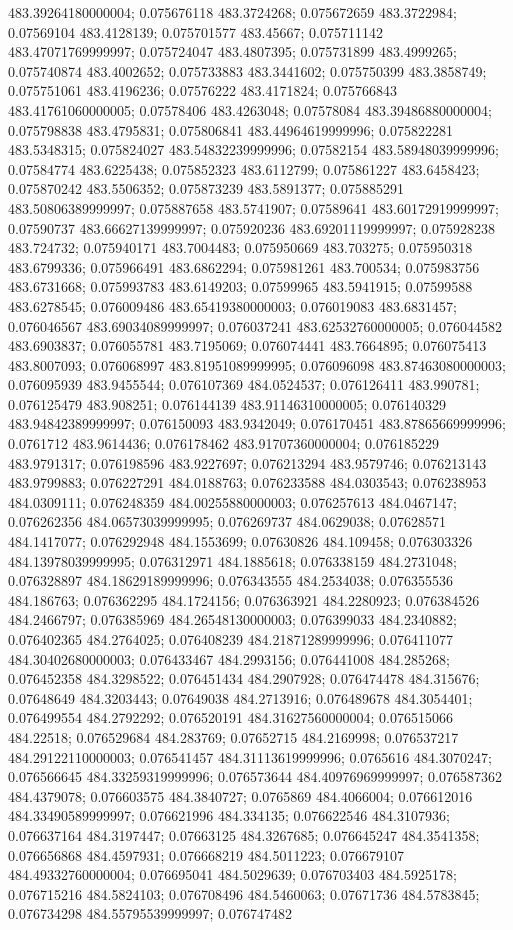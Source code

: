 483.39264180000004; 0.075676118 483.3724268; 0.075672659 483.3722984; 0.07569104 483.4128139; 0.075701577 483.45667; 0.075711142 483.47071769999997; 0.075724047 483.4807395; 0.075731899 483.4999265; 0.075740874 483.4002652; 0.075733883 483.3441602; 0.075750399 483.3858749; 0.075751061 483.4196236; 0.07576222 483.4171824; 0.075766843 483.41761060000005; 0.07578406 483.4263048; 0.07578084 483.39486880000004; 0.075798838 483.4795831; 0.075806841 483.44964619999996; 0.075822281 483.5348315; 0.075824027 483.54832239999996; 0.07582154 483.58948039999996; 0.07584774 483.6225438; 0.075852323 483.6112799; 0.075861227 483.6458423; 0.075870242 483.5506352; 0.075873239 483.5891377; 0.075885291 483.50806389999997; 0.075887658 483.5741907; 0.07589641 483.60172919999997; 0.07590737 483.66627139999997; 0.075920236 483.69201119999997; 0.075928238 483.724732; 0.075940171 483.7004483; 0.075950669 483.703275; 0.075950318 483.6799336; 0.075966491 483.6862294; 0.075981261 483.700534; 0.075983756 483.6731668; 0.075993783 483.6149203; 0.07599965 483.5941915; 0.07599588 483.6278545; 0.076009486 483.65419380000003; 0.076019083 483.6831457; 0.076046567 483.69034089999997; 0.076037241 483.62532760000005; 0.076044582 483.6903837; 0.076055781 483.7195069; 0.076074441 483.7664895; 0.076075413 483.8007093; 0.076068997 483.81951089999995; 0.076096098 483.87463080000003; 0.076095939 483.9455544; 0.076107369 484.0524537; 0.076126411 483.990781; 0.076125479 483.908251; 0.076144139 483.91146310000005; 0.076140329 483.94842389999997; 0.076150093 483.9342049; 0.076170451 483.87865669999996; 0.0761712 483.9614436; 0.076178462 483.91707360000004; 0.076185229 483.9791317; 0.076198596 483.9227697; 0.076213294 483.9579746; 0.076213143 483.9799883; 0.076227291 484.0188763; 0.076233588 484.0303543; 0.076238953 484.0309111; 0.076248359 484.00255880000003; 0.076257613 484.0467147; 0.076262356 484.06573039999995; 0.076269737 484.0629038; 0.07628571 484.1417077; 0.076292948 484.1553699; 0.07630826 484.109458; 0.076303326 484.13978039999995; 0.076312971 484.1885618; 0.076338159 484.2731048; 0.076328897 484.18629189999996; 0.076343555 484.2534038; 0.076355536 484.186763; 0.076362295 484.1724156; 0.076363921 484.2280923; 0.076384526 484.2466797; 0.076385969 484.26548130000003; 0.076399033 484.2340882; 0.076402365 484.2764025; 0.076408239 484.21871289999996; 0.076411077 484.30402680000003; 0.076433467 484.2993156; 0.076441008 484.285268; 0.076452358 484.3298522; 0.076451434 484.2907928; 0.076474478 484.315676; 0.07648649 484.3203443; 0.07649038 484.2713916; 0.076489678 484.3054401; 0.076499554 484.2792292; 0.076520191 484.31627560000004; 0.076515066 484.22518; 0.076529684 484.283769; 0.07652715 484.2169998; 0.076537217 484.29122110000003; 0.076541457 484.31113619999996; 0.0765616 484.3070247; 0.076566645 484.33259319999996; 0.076573644 484.40976969999997; 0.076587362 484.4379078; 0.076603575 484.3840727; 0.0765869 484.4066004; 0.076612016 484.33490589999997; 0.076621996 484.334135; 0.076622546 484.3107936; 0.076637164 484.3197447; 0.07663125 484.3267685; 0.076645247 484.3541358; 0.076656868 484.4597931; 0.076668219 484.5011223; 0.076679107 484.49332760000004; 0.076695041 484.5029639; 0.076703403 484.5925178; 0.076715216 484.5824103; 0.076708496 484.5460063; 0.07671736 484.5783845; 0.076734298 484.55795539999997; 0.076747482 